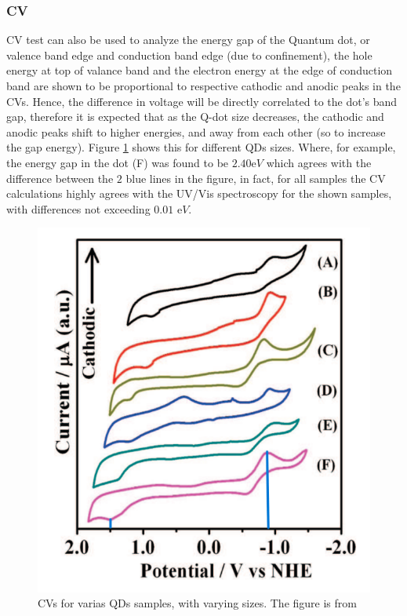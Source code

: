 \documentclass[twoside,11pt]{article}
\begin{document}
        \subsubsection{CV}
        CV test can also be used to analyze the energy gap of the Quantum dot, or  valence band edge and conduction band edge (due to confinement), the hole energy at top of valance band and the electron energy at the edge of conduction band are shown to be proportional to respective cathodic and anodic peaks in the CVs. Hence, the difference in voltage will be directly correlated to the dot's band gap, therefore it is expected that as the Q-dot size decreases, the cathodic and anodic peaks shift to higher energies, and away from each other (so to increase the gap energy). Figure \ref{fig:CV} shows this for different QDs sizes. Where, for example, the energy gap in the dot (F) was found to be $2.40$e$V$ which agrees with the difference between the $2$ blue lines in the figure, in fact, for all samples the CV calculations highly agrees with the UV/Vis spectroscopy for the shown samples, with differences not exceeding $0.01$ e$V$.\cite{haram2011quantum}


        \begin{figure}[h]
            \centering
            \includegraphics[scale=0.4]{CV_QDs.png}
            \caption{CVs for varias QDs samples, with varying sizes. The figure is from \cite{haram2011quantum}}
            \label{fig:CV}
        \end{figure}
            
\end{document}
